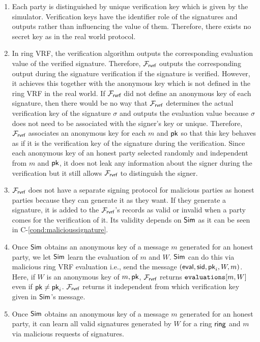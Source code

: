 \begin{enumerate}[label={{R-} }{{\arabic*}}, start = 1]
	\item Each party is distinguished by unique verification key which is given by the simulator. Verification keys have the identifier role of  the signatures and outputs rather than  influencing the value of them. Therefore, there exists no secret key as in the real world protocol.
	
	\item In ring VRF, the verification algorithm outputs the corresponding evaluation value of the verified signature. Therefore, $ \mathcal{F}_{\textsf{rvrf}} $  outputs the corresponding output during the signature verification if the signature is verified. However, it achieves this together with the anonymous key which is not defined in the ring VRF in the real world.  If $ \mathcal{F}_{\textsf{rvrf}} $ did not define an anonymous key of each signature, then there would be no way that $ \mathcal{F}_{\textsf{rvrf}} $ determines the actual verification key of the signature $ \sigma $ and outputs the evaluation value because $ \sigma $ does not need to be associated with the signer's key or unique. Therefore, $ \mathcal{F}_{\textsf{rvrf}} $ associates an anonymous key for each $ m $ and $ \mathsf{pk} $ so that this key behaves as if it is the verification key of the signature during the verification. Since each anonymous key of an honest party selected randomly and independent from $ m $ and $ \mathsf{pk} $, it does not leak any information about the signer during the verification but it still allows $ \mathcal{F}_{\textsf{rvrf}} $ to distinguish the signer.
	
	\item $ \mathcal{F}_{\textsf{rvrf}} $ does not have a separate signing protocol for malicious parties as honest parties because they can generate it as they want. If they generate a signature, it is added to the $ \mathcal{F}_{\textsf{rvrf}} $'s records as valid or invalid when a party comes for the verification of it.  Its validity depends on $ \mathsf{Sim} $ as it can be seen in C-\ref{cond:malicioussignature}. 
	
	\item Once $ \mathsf{Sim} $ obtains an anonymous key of a message $ m $ generated for an honest party, we let $ \mathsf{Sim} $ learn the  evaluation of  $ m $ and  $ W $. $ \mathsf{Sim} $ can do this via malicious ring VRF evaluation i.e., send the message $ (\mathsf{eval}, \textsf{sid}, \mathsf{pk}_i,W,m) $. Here, if $ W $ is an anonymous key of $ m, \mathsf{pk}  $, $ \mathcal{F}_{\textsf{rvrf}} $ returns $ \texttt{evaluations}[m, W] $ even if $ \mathsf{pk} \neq \mathsf{pk}_i $. $ \mathcal{F}_{\textsf{rvrf}} $ returns it independent from which verification key given in $ \mathsf{Sim} $'s message. 
	
	\item Once $ \mathsf{Sim} $ obtains an anonymous key of a message $ m $ generated for an honest party, it can learn all valid signatures generated by $ W $ for a ring $ \mathsf{ring} $ and $ m $ via malicious requests of signatures.
	
\end{enumerate}
